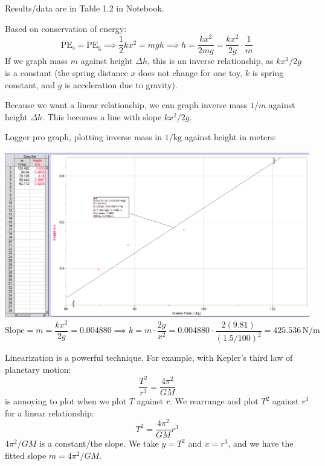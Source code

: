 \documentclass{article}
\newcommand{\remark}[2]{\begin{tcolorbox}[title={#1},colback=black!5!white,colframe=black!75!black,parbox=false] #2 \end{tcolorbox}}
\begin{document}
Results/data are in Table 1.2 in Notebook.

Based on conservation of energy:
\begin{equation*}
    \text{PE}_ \text{s}= \text{PE}_ \text{g}
	\implies \frac12kx^2=mgh
	\implies h=\frac{kx^2}{2mg}=\frac{kx^2}{2g}\cdot\frac1m
\end{equation*}
If we graph mass $m$ against height $\Delta h$, this is an inverse relationship, as $kx^2/2g$ is a constant (the spring distance $x$ does not change for one toy, $k$ is spring constant, and $g$ is acceleration due to gravity).

Because we want a linear relationship, we can graph inverse mass $1/m$ against height $\Delta h$. This becomes a line with slope $kx^2/2g$.

Logger pro graph, plotting inverse mass in $1/\text{kg}$ against height in meters:

\includegraphics[width=\linewidth]{loggerpro0903.png}
\begin{equation*}
	\text{Slope}
	=m 
	=\frac{kx^2}{2g}
	=0.004880
	\implies k=m\cdot \frac{2g}{x^2}
	=0.004880\cdot \frac{2(9.81)}{(1.5/100)^2}
	=\boxed{425.536\,\si{\newton\per\meter}}
\end{equation*}

\remark{Linearization}{Linearization is a powerful technique. For example, with Kepler's third law of planetary motion:
\begin{equation*}
    \frac{T^2}{r^3}=\frac{4\pi^2}{GM}
\end{equation*}
is annoying to plot when we plot $T$ against $r$. We rearrange and plot $T^2$ against $r^3$ for a linear relationship:
\begin{equation*}
    T^2=\frac{4\pi^2}{GM}r^3
\end{equation*}
$4\pi^2/GM$ is a constant/the slope. We take $y=T^2$ and $x=r^3$, and we have the fitted slope $m=4\pi^2/GM$.}
\end{document}
